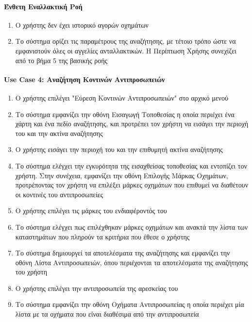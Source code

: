 \documentclass{../ol-softwaremanual}
\begin{document}
	\paragraph{Ένθετη Εναλλακτική Ροή}
	\begin{enumerate}
			\item Ο χρήστης δεν έχει ιστορικό αγορών οχημάτων
			\item Το σύστημα ορίζει τις παραμέτρους της αναζήτησης, με τέτοιο τρόπο ώστε να εμφανιστούν όλες οι αγγελίες ανταλλακτικών. Η Περίπτωση Χρήσης συνεχίζει από το βήμα 5 της βασικής ροής
	\end{enumerate}
	
	
	\paragraph{\en Use Case 4: \gr Αναζήτηση Κοντινών Αντιπροσωπειών}	
	
	\begin{enumerate}
		\item Ο χρήστης επιλέγει  \en"\gr Εύρεση Κοντινών Αντιπροσωπειών\en" \gr στο αρχικό μενού
		\item Το σύστημα εμφανίζει την οθόνη Εισαγωγή Τοποθεσίας η οποία περιέχει ένα χάρτη και ένα πεδίο αναζήτησης, και προτρέπει τον χρήστη να εισάγει την περιοχή του και την ακτίνα αναζήτησης
		\item Ο χρήστης εισάγει την περιοχή του και την επιθυμητή ακτίνα αναζήτησης		
		\item Το σύστημα ελέγχει την εγκυρότητα της εισαχθείσας τοποθεσίας και εντοπίζει τον χρήστη. Στην συνέχεια, εμφανίζει την οθόνη Επιλογής Μάρκας Οχημάτων, προτρέποντας τον χρήστη να επιλέξει μάρκες οχημάτων που επιθυμεί να διαθέτουν οι κοντινές του αντιπροσωπείες
		\item Ο χρήστης επιλέγει τις μάρκες του ενδιαφέροντός του			
		\item Το σύστημα ελέγχει πως επιλέχθηκαν μάρκες οχημάτων και ανακτά την λίστα των καταστημάτων που πληρούν τα κριτήρια που έθεσε ο χρήστης
		\item Το σύστημα δημιουργεί τα αποτελέσματα της αναζήτησης και εμφανίζει την οθόνη Λίστα Αντιπροσωπειών, όπου περιέχονται τα αποτελέσματα της αναζήτησης του χρήστη
		\item Ο χρήστης επιλέγει την αντιπροσωπεία της αρεσκείας του
		\item Το σύστημα εμφανίζει την οθόνη Οχήματα Αντιπροσωπείας η οποία περιέχει μία λίστα με τα οχήματα που είναι διαθέσιμα από την αντιπροσωπεία     	
	\end{enumerate}
	
\end{document}
